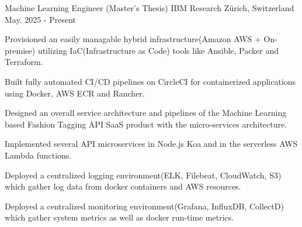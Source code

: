 

\begin{cventries}

  \cventry
    {Machine Learning Engineer (Master's Thesis)} %
    {IBM Research} %
    {Zürich, Switzerland} %
    {May. 2025 - Present} %
    {
      \begin{cvitems} %
        \item {Provisioned an easily managable hybrid infrastructure(Amazon AWS + On-premise) utilizing IaC(Infrastructure as Code) tools like Ansible, Packer and Terraform.}
        \item {Built fully automated CI/CD pipelines on CircleCI for containerized applications using Docker, AWS ECR and Rancher.}
        \item {Designed an overall service architecture and pipelines of the Machine Learning based Fashion Tagging API SaaS product with the micro-services architecture.}
        \item {Implemented several API microservices in Node.js Koa and in the serverless AWS Lambda functions.}
        \item {Deployed a centralized logging environment(ELK, Filebeat, CloudWatch, S3) which gather log data from docker containers and AWS resources.}
        \item {Deployed a centralized monitoring environment(Grafana, InfluxDB, CollectD) which gather system metrics as well as docker run-time metrics.}
      \end{cvitems}
    }


\end{cventries}
